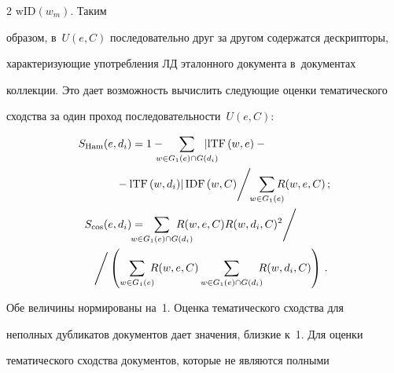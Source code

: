 \begin{multicols}{2}
$\mathrm{wID}\left(w_m\right)$. Таким 

образом, в~$U(e,C)$ последовательно друг за другом содержатся дескрипторы, 

характеризующие употребления ЛД эталонного документа в~документах 

коллекции. Это дает возможность вычислить следующие оценки тематического 

сходства за один проход последовательности~$U(e,C)$:

\begin{align*}

S_{\mathrm{Ham}}(e,d_i)&=1-\hspace*{-3mm}\sum\limits_{w\in G_1(e)\cap G(d_i)}\hspace*{-5mm}

\left\vert \mathrm{lTF}\,(w,e)-{}\right.\\

&\left.\hspace*{-6mm}{}-

\mathrm{lTF}\,(w,d_i)\right\vert \mathrm{IDF}\,(w,C)\Bigg/\hspace*{-1mm}

\sum\limits_{w\in G_1(e)}\hspace*{-3mm} R(w,e,C)\,;

\\

S_{\mathrm{cos}}(e,d_i) &=\hspace*{-5mm}\sum\limits_{w\in G_1(e)\cap G(d_i)}\hspace*{-6mm}

 R(w,e,C) R(w,d_i, 

C)^2\Bigg/ \\

&\hspace*{-34pt}\Bigg/

\left(\sum\limits_{w\in G_1(e)} \hspace*{-2mm}R(w,e,C) \sum\limits_{w\in G_1(e)\cap 

G(d_i)}\hspace*{-2mm} R(w,d_i,C)\right)\,.

\end{align*}

  

  Обе величины нормированы на~1. Оценка тематического сходства для 

неполных дубликатов документов дает значения, близкие к~1. Для оценки 

тематического сходства документов, которые не являются полными 


\end{multicols}
